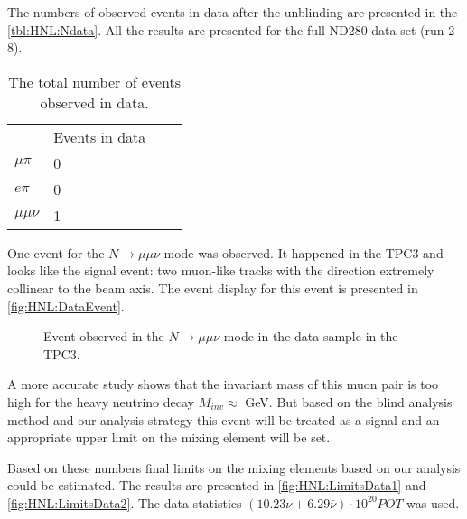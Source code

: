 \documentclass[../main.tex]{subfiles}
\begin{document}
The numbers of observed events in data after the unblinding are presented in the \autoref{tbl:HNL:Ndata}. All the results are presented for the full ND280 data set (run 2-8).

\begin{table}[!ht]
\begin{center}
\begin{tabular}{llll}
                            & Events in data      \\
  $\mu\pi$ \hspace{0.5cm}   & 0  \hspace{2cm}     \\
  $e\pi$                    & 0                   \\
  $\mu\mu\nu$               & 1                   \\
\end{tabular}
\caption{The total number of events observed in data.}
\label{tbl:HNL:Ndata}
\end{center}
\end{table}

One event for the $N\to\mu\mu\nu$ mode was observed. It happened in the TPC3 and looks like the signal event: two muon-like tracks with the direction extremely collinear to the beam axis. The event display for this event is presented in \autoref{fig:HNL:DataEvent}.

\begin{figure}[!ht]
    \begin{center}
  \begin{minipage}{0.49\linewidth}
  \end{minipage}
  \begin{minipage}{0.49\linewidth}
  \end{minipage}
  \caption{Event observed in the $N\to\mu\mu\nu$ mode in the data sample in the TPC3.}
  \label{fig:HNL:DataEvent}
  \end{center}
\end{figure}

A more accurate study shows that the invariant mass of this muon pair is too high for the heavy neutrino decay $M_{inv}\approx$ GeV. But based on the blind analysis method and our analysis strategy this event will be treated as a signal and an appropriate upper limit on the mixing element will be set.

Based on these numbers final limits on the mixing elements based on our analysis could be estimated. The results are presented in \autoref{fig:HNL:LimitsData1} and \autoref{fig:HNL:LimitsData2}. The data statistics $\left(10.23\nu+6.29\bar{\nu}\right)\cdot 10^{20}POT$ was used.
\end{document}
